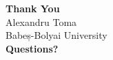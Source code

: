 \documentclass[aspectratio=169, xcolor={dvipsnames}]{beamer}
\begin{document}
\begin{frame}[plain]
    \begin{center}
        \vspace{1cm}
        {\Huge \textbf{Thank You}} \\
        \vspace{1cm}
        \Large Alexandru Toma \\
        \large Babeș-Bolyai University \\
        \vspace{1cm}
        \textbf{\textcolor{MutedTeal}{Questions?}}
    \end{center}
\end{frame}
\end{document}
